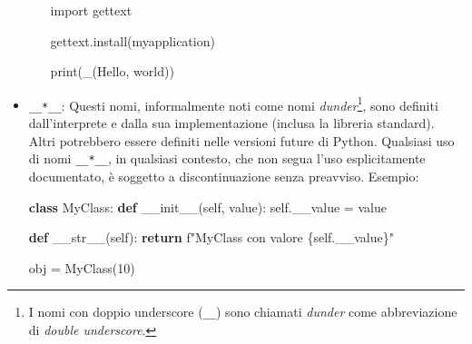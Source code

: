 \documentclass[
  letterpaper,
]{scrbook}
\newenvironment{Shaded}{\begin{snugshade}}{\end{snugshade}}
\newcommand{\BuiltInTok}[1]{\textcolor[rgb]{0.00,0.23,0.31}{#1}}
\newcommand{\ControlFlowTok}[1]{\textcolor[rgb]{0.00,0.23,0.31}{\textbf{#1}}}
\newcommand{\DecValTok}[1]{\textcolor[rgb]{0.68,0.00,0.00}{#1}}
\newcommand{\FunctionTok}[1]{\textcolor[rgb]{0.28,0.35,0.67}{#1}}
\newcommand{\ImportTok}[1]{\textcolor[rgb]{0.00,0.46,0.62}{#1}}
\newcommand{\KeywordTok}[1]{\textcolor[rgb]{0.00,0.23,0.31}{\textbf{#1}}}
\newcommand{\NormalTok}[1]{\textcolor[rgb]{0.00,0.23,0.31}{#1}}
\newcommand{\OperatorTok}[1]{\textcolor[rgb]{0.37,0.37,0.37}{#1}}
\newcommand{\SpecialCharTok}[1]{\textcolor[rgb]{0.37,0.37,0.37}{#1}}
\newcommand{\SpecialStringTok}[1]{\textcolor[rgb]{0.13,0.47,0.30}{#1}}
\newcommand{\StringTok}[1]{\textcolor[rgb]{0.13,0.47,0.30}{#1}}
\newcommand{\VariableTok}[1]{\textcolor[rgb]{0.07,0.07,0.07}{#1}}
\providecommand{\tightlist}{%
  \setlength{\itemsep}{0pt}\setlength{\parskip}{0pt}}\usepackage{longtable,booktabs,array}
\newcommand*\circled[1]{\tikz[baseline=(char.base)]{
          \node[shape=circle,draw,inner sep=1pt] (char) {{\scriptsize#1}};}}
\begin{document}
\begin{itemize}
\begin{itemize}
\begin{Shaded}
\begin{Highlighting}[]
\ImportTok{import}\NormalTok{ gettext}

\NormalTok{gettext.install(}\StringTok{\textquotesingle{}myapplication\textquotesingle{}}\NormalTok{)}

\BuiltInTok{print}\NormalTok{(\_(}\StringTok{\textquotesingle{}Hello, world\textquotesingle{}}\NormalTok{)) }\hspace*{\fill}\NormalTok{\circled{2}}
\end{Highlighting}
\end{Shaded}

  \end{itemize}
\item
  \texttt{\_\_*\_\_}: Questi nomi, informalmente noti come nomi
  \emph{dunder}\footnote{I nomi con doppio underscore (\texttt{\_\_})
    sono chiamati \emph{dunder} come abbreviazione di \emph{double
    underscore}.}, sono definiti dall'interprete e dalla sua
  implementazione (inclusa la libreria standard). Altri potrebbero
  essere definiti nelle versioni future di Python. Qualsiasi uso di nomi
  \texttt{\_\_*\_\_}, in qualsiasi contesto, che non segua l'uso
  esplicitamente documentato, è soggetto a discontinuazione senza
  preavviso. Esempio:

\label{annotated-cell-168}%
\begin{Shaded}
\begin{Highlighting}[]
\KeywordTok{class}\NormalTok{ MyClass:}
  \KeywordTok{def} \FunctionTok{\_\_init\_\_}\NormalTok{(}\VariableTok{self}\NormalTok{, value): }\hspace*{\fill}\NormalTok{\circled{1}}
    \VariableTok{self}\NormalTok{.\_\_value }\OperatorTok{=}\NormalTok{ value}

  \KeywordTok{def} \FunctionTok{\_\_str\_\_}\NormalTok{(}\VariableTok{self}\NormalTok{):}
    \ControlFlowTok{return} \SpecialStringTok{f"MyClass con valore }\SpecialCharTok{\{}\VariableTok{self}\SpecialCharTok{.}\NormalTok{\_\_value}\SpecialCharTok{\}}\SpecialStringTok{"} \hspace*{\fill}\NormalTok{\circled{2}}

\NormalTok{obj }\OperatorTok{=}\NormalTok{ MyClass(}\DecValTok{10}\NormalTok{)}


\end{Highlighting}
\end{Shaded}
\end{itemize}
\end{document}

